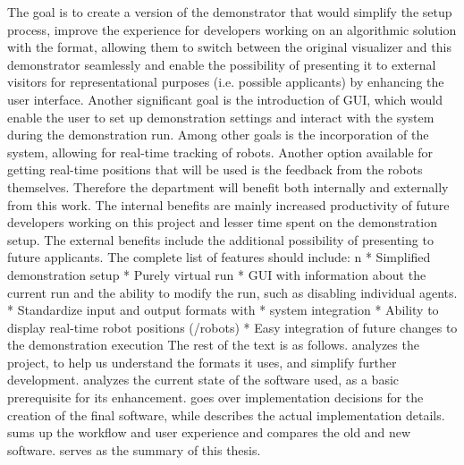 The goal is to create a version of the demonstrator that would simplify the setup process, improve the experience for developers working on an algorithmic solution with the {\mapfIR} format, allowing them to switch between the original visualizer and this demonstrator seamlessly and enable the possibility of presenting it to external visitors for representational purposes (i.e. possible applicants) by enhancing the user interface.\br
Another significant goal is the introduction of GUI, which would enable the user to set up demonstration settings and interact with the system during the demonstration run.
Among other goals is the incorporation of the {\vicon} system, allowing for real-time tracking of robots. Another option available for getting real-time positions that will be used is the feedback from the robots themselves.\br
\br
Therefore the department will benefit both internally and externally from this work. The internal benefits are mainly increased productivity of future developers working on this project and lesser time spent on the demonstration setup. The external benefits include the additional possibility of presenting to future applicants.
The complete list of features should include:
\begitems \style n
    * Simplified demonstration setup
    * Purely virtual run
    * GUI with information about the current run and the ability to modify the run, such as disabling individual agents. 
    * Standardize input and output formats with \mapfIR
    * {\vicon} system integration
    * Ability to display real-time robot positions ({\vicon}/robots)
    * Easy integration of future changes to the demonstration execution
\enditems
\br
The rest of the text is as follows.\br
{} analyzes the {\mapfIR} project, to help us understand the formats it uses, and simplify further development. {} analyzes the current state of the software used, as a basic prerequisite for its enhancement. {} goes over implementation decisions for the creation of the final software, while {} describes the actual implementation details. {} sums up the workflow and user experience and compares the old and new software. {} serves as the summary of this thesis.